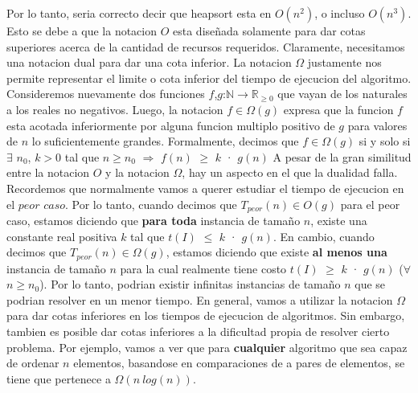 \documentclass[10pt,a4paper]{article}
\begin{document}
\newline
\newline
Por lo tanto, seria correcto decir que heapsort esta en $O(n^{2})$, o incluso $O(n^{3})$. Esto se debe a que la notacion $O$ esta diseñada solamente para dar cotas superiores acerca de la cantidad de recursos requeridos. Claramente, necesitamos una notacion dual para dar una cota inferior. La notacion $\Omega$ justamente nos permite representar el limite o cota inferior del tiempo de ejecucion del algoritmo.
\newline
\newline
Consideremos nuevamente dos funciones $f$,$g$:$\mathbb{N} \to \mathbb{R}_{\geq 0}$ que vayan de los naturales a los reales no negativos. Luego, la notacion $f \in \Omega(g)$ expresa que la funcion $f$ esta acotada inferiormente por alguna funcion multiplo positivo de $g$ para valores de $n$ lo suficientemente grandes. Formalmente, decimos que $f \in \Omega(g)$ si y solo si
\newline
\newline
$\exists$ $n_{0}$, $k > 0$ tal que $n \geq n_{0}$ $\Rightarrow$ $f(n)$ $\geq$ $k$ · $g(n)$
\newline
\newline
A pesar de la gran similitud entre la notacion $O$ y la notacion $\Omega$, hay un aspecto en el que la dualidad falla. Recordemos que normalmente vamos a querer estudiar el tiempo de ejecucion en el $peor$ $caso$. Por lo tanto, cuando decimos que $T_{peor}(n) \in O(g)$ para el peor caso, estamos diciendo que \textbf{para toda} instancia de tamaño $n$, existe una constante real positiva $k$ tal que $t(I)$ $\leq$ $k$ · $g(n)$. En cambio,
cuando decimos que $T_{peor}(n) \in \Omega(g)$, estamos diciendo que existe \textbf{al menos una} instancia de tamaño $n$ para la cual realmente tiene costo $t(I)$ $\geq$ $k$ · $g(n)$ ($\forall$ $n \geq n_{0}$). Por lo tanto, podrian existir infinitas instancias de tamaño $n$ que se podrian resolver en un menor tiempo.
\newline
\newline
En general, vamos a utilizar la notacion $\Omega$ para dar cotas inferiores en los tiempos de ejecucion de algoritmos. Sin embargo, tambien es posible dar cotas inferiores a la dificultad propia de resolver cierto problema. Por ejemplo, vamos a ver que para \textbf{cualquier} algoritmo que sea capaz de ordenar $n$ elementos, basandose en comparaciones de a pares de elementos, se tiene que pertenece a $\Omega(n ~ log(n))$. 
\newline
\end{document}
